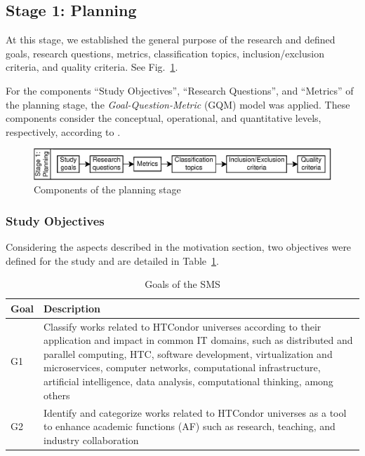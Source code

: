 \subsection{Stage 1: Planning}\label{sec:planeacion}

At this stage, we established the general purpose of the research and defined goals, research questions, metrics, classification topics, inclusion/exclusion criteria, and quality criteria. See Fig.~\ref{fig:PlanningStageOverview}.

For the components ``Study Objectives'', ``Research Questions'', and ``Metrics'' of the planning stage, the {\itshape Goal-Question-Metric} (GQM) model \cite{basili1992software, caldiera1994goal} was applied. These components consider the conceptual, operational, and quantitative levels, respectively, according to \cite{Sepúlveda202141}.

\begin{figure}[ht]
	\centering
	\includegraphics[scale=1.0]{resources/figures/sms-Etapa-1.eps}
	\caption{Components of the planning stage}
	\label{fig:PlanningStageOverview}
\end{figure}

\subsubsection{Study Objectives}
Considering the aspects described in the motivation section, two objectives were defined for the study and are detailed in Table~\ref{table:Goals}.

\begin{table}[ht]
\renewcommand{\arraystretch}{1.3}
    \centering
	\caption{Goals of the SMS}
    \begin{tabular}{p{1cm}p{5.8cm}}
        \hline
        \textbf{Goal} & \textbf{Description} \\
        \hline
        G1   & Classify works related to HTCondor universes according to their application and impact in common IT domains, such as distributed and parallel computing, HTC, software development, virtualization and microservices, computer networks, computational infrastructure, artificial intelligence, data analysis, computational thinking, among others \\
        G2   & Identify and categorize works related to HTCondor universes as a tool to enhance academic functions (AF) such as research, teaching, and industry collaboration \\
        \hline
    \end{tabular}
	\label{table:Goals}
\end{table}


